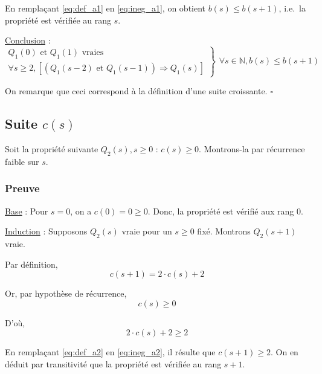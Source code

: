 \documentclass[12pt,a4paper]{article}
\begin{document}
\begin{appendices}
En rempla\c{c}ant \eqref{eq:def_a1} en \eqref{eq:ineg_a1}, on obtient $b(s) \leq b(s+1)$, i.e.\ la propri\'et\'e est v\'erifi\'ee au rang $s$.

\medskip
\underline{Conclusion} : 
\begin{equation*}
\left .\begin{array}{l}
Q_{1}(0) \text{ et } Q_{1}(1) \text{ vraies } \\
\forall s \geq 2, [(Q_{1}(s-2) \text{ et } Q_{1}(s-1)) \Rightarrow Q_{1}(s) ]
\end{array} \right \}
\left .\begin{array}{l}
\forall s \in \mathbb{N}, b(s) \leq b(s+1)
\end{array}\right .
\end{equation*}

\bigskip
On remarque que ceci correspond \`a la d\'efinition d'une suite croissante. \hfill\ensuremath{\square}

\subsection*{Suite $c(s)$}
Soit la propri\'et\'e suivante $Q_{2}(s), s \geq 0$ : $c(s) \geq 0$.
Montrons-la par r\'ecurrence faible sur $s$.

\subsubsection*{Preuve}
\underline{Base} : Pour $s = 0$, on a $c(0) = 0 \geq 0$. 
Donc, la propri\'et\'e est v\'erifi\'e aux rang 0.

\medskip
\underline{Induction} : Supposons $Q_{2}(s)$ vraie pour un $s \geq 0$ fix\'e. 
Montrons $Q_{2}(s+1)$ vraie.

\smallskip
Par d\'efinition,
\begin{equation}
   c(s+1) = 2\cdot c(s) + 2 \label{eq:def_a2}
\end{equation}

Or, par hypoth\`ese de r\'ecurrence,
\begin{equation*}
   c(s) \geq 0
\end{equation*}

D'o\`u, 
\begin{equation}
   2\cdot c(s)+2 \geq 2 \label{eq:ineg_a2}
\end{equation}

En rempla\c{c}ant \eqref{eq:def_a2} en \eqref{eq:ineg_a2}, il r\'esulte que $c(s+1) \geq 2$. On en d\'eduit par transitivit\'e que la propri\'et\'e est v\'erifi\'ee au rang $s+1$.


\end{appendices}
\end{document}
